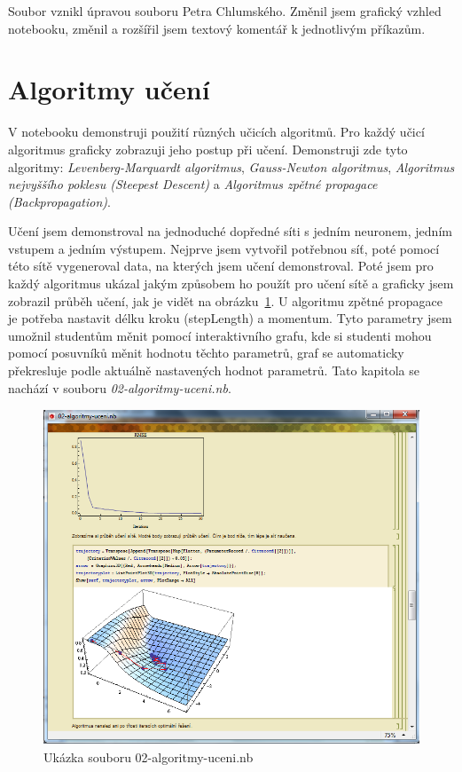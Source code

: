 \documentclass[11pt,twoside,a4paper]{book}
\begin{document}
Soubor vznikl úpravou souboru Petra Chlumského. Změnil jsem grafický vzhled notebooku, změnil a rozšířil jsem textový komentář k jednotlivým příkazům.

\section{Algoritmy učení}
V notebooku demonstruji použití různých učicích algoritmů. Pro každý učicí algoritmus graficky zobrazuji jeho postup při učení. Demonstruji zde tyto algoritmy: \textit{Levenberg-Marquardt algoritmus}, \textit{Gauss-Newton algoritmus}, \textit{Algoritmus nejvyššího poklesu (Steepest Descent)} a \textit{Algoritmus zpětné propagace (Backpropagation)}.

Učení jsem demonstroval na jednoduché dopředné síti s jedním neuronem, jedním vstupem a jedním výstupem. Nejprve jsem vytvořil potřebnou síť, poté pomocí této sítě vygeneroval data, na kterých jsem učení demonstroval. Poté jsem pro každý algoritmus ukázal jakým způsobem ho použít pro učení sítě a graficky jsem zobrazil průběh učení, jak je vidět na obrázku~\ref{fig:algoritmy-uceni}. U algoritmu zpětné propagace je potřeba nastavit délku kroku (stepLength) a momentum. Tyto parametry jsem umožnil studentům měnit pomocí interaktivního grafu, kde si studenti mohou pomocí posuvníků měnit hodnotu těchto parametrů, graf se automaticky překresluje podle aktuálně nastavených hodnot parametrů. Tato kapitola se nachází v souboru \textit{02-algoritmy-uceni.nb}.

\begin{figure}[h!]
\begin{center}
\includegraphics[height=10cm]{figures/ukazka02.png}
\caption{Ukázka souboru 02-algoritmy-uceni.nb}
\label{fig:algoritmy-uceni}
\end{center}
\end{figure}
\newpage
\end{document}
